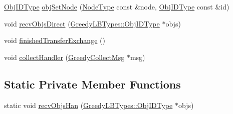 \begin{DoxyCompactItemize}
\hyperlink{structvt_1_1vrt_1_1collection_1_1lb_1_1_base_l_b_a15a2f756b59c8c2437985206b32aa403}{Obj\+I\+D\+Type} \hyperlink{structvt_1_1vrt_1_1collection_1_1lb_1_1_greedy_l_b_a38efce04a8fabdc16d89331b639f534f}{obj\+Set\+Node} (\hyperlink{namespacevt_a866da9d0efc19c0a1ce79e9e492f47e2}{Node\+Type} const \&node, \hyperlink{structvt_1_1vrt_1_1collection_1_1lb_1_1_base_l_b_a15a2f756b59c8c2437985206b32aa403}{Obj\+I\+D\+Type} const \&id)
\item 
void \hyperlink{structvt_1_1vrt_1_1collection_1_1lb_1_1_greedy_l_b_a0e11225d8ff8a52f286f14a2c8f6cabb}{recv\+Objs\+Direct} (\hyperlink{structvt_1_1vrt_1_1collection_1_1lb_1_1_greedy_l_b_types_a201f3d97240fe881e1ed6c0d2cfde262}{Greedy\+L\+B\+Types\+::\+Obj\+I\+D\+Type} $\ast$objs)
\item 
void \hyperlink{structvt_1_1vrt_1_1collection_1_1lb_1_1_greedy_l_b_aa2cdba9feec93e48d7cce1886a4eaa6a}{finished\+Transfer\+Exchange} ()
\item 
void \hyperlink{structvt_1_1vrt_1_1collection_1_1lb_1_1_greedy_l_b_ab5942458625157b9baae1e06b453a547}{collect\+Handler} (\hyperlink{structvt_1_1vrt_1_1collection_1_1lb_1_1_greedy_collect_msg}{Greedy\+Collect\+Msg} $\ast$msg)
\end{DoxyCompactItemize}
\subsection*{Static Private Member Functions}
\begin{DoxyCompactItemize}
\item 
static void \hyperlink{structvt_1_1vrt_1_1collection_1_1lb_1_1_greedy_l_b_a2590d9a14ee124f30d86557f3cc5fb25}{recv\+Objs\+Han} (\hyperlink{structvt_1_1vrt_1_1collection_1_1lb_1_1_greedy_l_b_types_a201f3d97240fe881e1ed6c0d2cfde262}{Greedy\+L\+B\+Types\+::\+Obj\+I\+D\+Type} $\ast$objs)
\end{DoxyCompactItemize}
